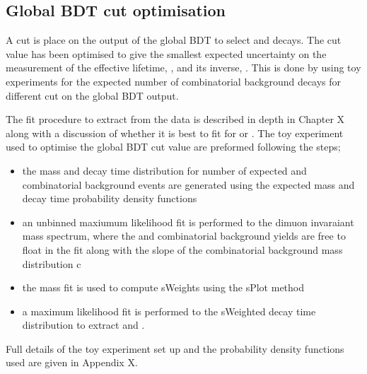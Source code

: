 \subsection{Global BDT cut optimisation}
\label{sec:globalBDToptimisation}

A cut is place on the output of the global BDT to select \bsmumu and \bhh decays. The cut value has been optimised to give the smallest expected uncertainty on the measurement of the \bsmumu effective lifetime, \tmumu, and its inverse, \invtmumu. This is done by using toy experiments for the expected number of \bsmumu combinatorial background decays for different cut on the global BDT output. 

The fit procedure to extract \tmumu from the data is described in depth in Chapter X along with a discussion of whether it is best to fit for \tmumu or \invtmumu. The toy experiment used to optimise the global BDT cut value are preformed following the steps;
\begin{itemize}
\item the mass and decay time distribution for number of expected \bsmumu and combinatorial background events are generated using the expected mass and decay time probability density functions
\item an unbinned maxiumum likelihood fit is performed to the dimuon invaraiant mass spectrum, where the \bsmumu and combinatorial background yields are free to float in the fit along with the slope of the combinatorial background mass distribution c
\item the mass fit is used to compute sWeights using the sPlot method \cite{}
\item a maximum likelihood fit is performed to the sWeighted decay time distribution to extract \tmumu and \invtmumu. 
\end{itemize}
Full details of the toy experiment set up and the probability density functions used are given in Appendix X. 

